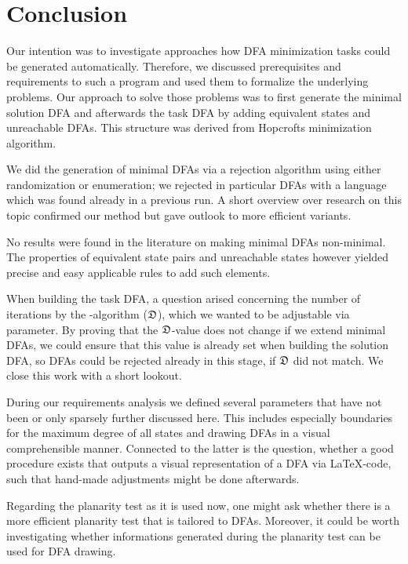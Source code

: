 
\chapter{Conclusion}

Our intention was to investigate approaches how DFA minimization tasks could be generated automatically. Therefore, we discussed prerequisites and requirements to such a program and used them to formalize the underlying problems. Our approach to solve those problems was to first generate the minimal solution DFA and afterwards the task DFA by adding equivalent states and unreachable DFAs. This structure was derived from Hopcrofts minimization algorithm.

We did the generation of minimal DFAs via a rejection algorithm using either randomization or enumeration; we rejected in particular DFAs with a language which was found already in a previous run. A short overview over research on this topic confirmed our method but gave outlook to more efficient variants.

No results were found in the literature on making minimal DFAs non-minimal. The properties of equivalent state pairs and unreachable states however yielded precise and easy applicable rules to add such elements.

When building the task DFA, a question arised concerning the number of iterations by the \CompDist-algorithm ($\mathfrak{D}$), which we wanted to be adjustable via parameter. By proving that the $\mathfrak{D}$-value does not change if we extend minimal DFAs, we could ensure that this value is already set when building the solution DFA, so DFAs could be rejected already in this stage, if $\mathfrak{D}$ did not match. We close this work with a short lookout.

During our requirements analysis we defined several parameters that have not been or only sparsely further discussed here. This includes especially boundaries for the maximum degree of all states and drawing DFAs in a visual comprehensible manner. Connected to the latter is the question, whether a good procedure exists that outputs a visual representation of a DFA via \LaTeX-code, such that hand-made adjustments might be done afterwards.

Regarding the planarity test as it is used now, one might ask whether there is a more efficient planarity test that is tailored to DFAs. Moreover, it could be worth investigating whether informations generated during the planarity test can be used for DFA drawing.

